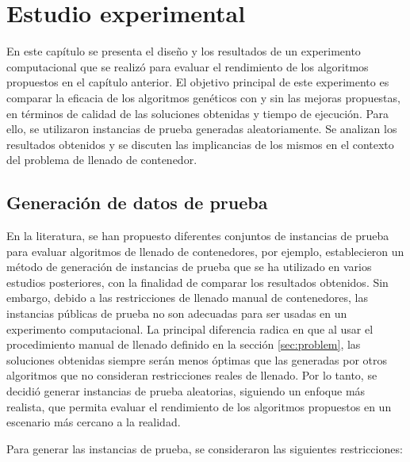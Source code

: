\section{Estudio experimental}

En este capítulo se presenta el diseño y los resultados de un experimento computacional que se realizó para evaluar el rendimiento de los algoritmos propuestos en el capítulo anterior. El objetivo principal de este experimento es comparar la eficacia de los algoritmos genéticos con y sin las mejoras propuestas, en términos de calidad de las soluciones obtenidas y tiempo de ejecución. Para ello, se utilizaron instancias de prueba generadas aleatoriamente. Se analizan los resultados obtenidos y se discuten las implicancias de los mismos en el contexto del problema de llenado de contenedor.

\subsection{Generación de datos de prueba}

En la literatura, se han propuesto diferentes conjuntos de instancias de prueba para evaluar algoritmos de llenado de contenedores, por ejemplo, \textcite{BISCHOFF1995377} establecieron un método de generación de instancias de prueba que se ha utilizado en varios estudios posteriores, con la finalidad de comparar los resultados obtenidos. Sin embargo, debido a las restricciones de llenado manual de contenedores, las instancias públicas de prueba no son adecuadas para ser usadas en un experimento computacional. La principal diferencia radica en que al usar el procedimiento manual de llenado definido en la sección \ref{sec:problem}, las soluciones obtenidas siempre serán menos óptimas que las generadas por otros algoritmos que no consideran restricciones reales de llenado. Por lo tanto, se decidió generar instancias de prueba aleatorias, siguiendo un enfoque más realista, que permita evaluar el rendimiento de los algoritmos propuestos en un escenario más cercano a la realidad.

Para generar las instancias de prueba, se consideraron las siguientes restricciones:

